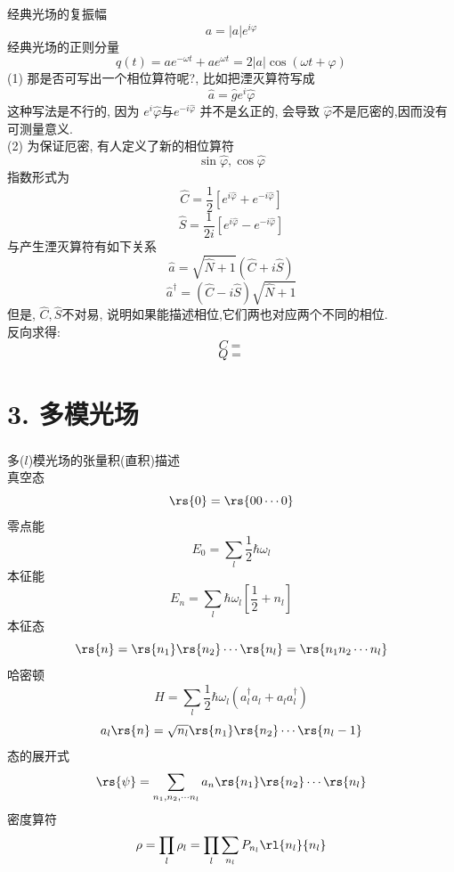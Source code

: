 \begin{frame} [allowframebreaks=] 
 \frametitle{}
      经典光场的复振幅 
      \[ a= \left|a\right| e^{i\varphi}\]
      经典光场的正则分量
      \[ q(t) = a e^{-\omega t} + a e^{\omega t} = 2\left|a \right|\cos(\omega t + \varphi)\]
      (1) 那是否可写出一个相位算符呢?, 比如把湮灭算符写成
      \[ \hat{a} = \hat{g} e ^ i \hat{\varphi} \]
      这种写法是不行的, 因为
      $e ^ i \hat{\varphi}$与$e ^ {-i \hat{\varphi}}$ 并不是幺正的, 会导致 $\hat{\varphi}$不是厄密的,因而没有可测量意义. \\ {\vspace*{0.3em}}
      (2) 为保证厄密, 有人定义了新的相位算符
      \[ \sin \hat{\varphi}, \cos \hat{\varphi}\]
      指数形式为
      \[\hat{C}= \frac{1}{2} [e^{i \hat{\varphi}} + e^{- i \hat{\varphi}}]\]
      \[\hat{S}= \frac{1}{2i} [e^{i \hat{\varphi}} - e^{- i \hat{\varphi}}]\]
      与产生湮灭算符有如下关系
      \[\hat{a}= \sqrt{\hat{N}+1}(\hat{C}+i\hat{S})\]
      \[\hat{a}^{\dagger}= (\hat{C}-i\hat{S})\sqrt{\hat{N}+1}\]
      但是, $\hat{C}, \hat{S}$不对易, 说明如果能描述相位,它们两也对应两个不同的相位.\\ 
      反向求得:
      \[ C= \]
      \[ Q= \]
\end{frame}

\section{3. 多模光场}

\begin{frame}[allowframebreaks=]  
 \frametitle{}
 多($l$)模光场的张量积(直积)描述\\ 
 真空态
 \[ \rs{0 }= \rs{00\cdots 0 } \] 
零点能
\[ E_0 = \sum_l \frac{1}{2} \hbar \omega_l\]
本征能
\[ E_n = \sum_l  \hbar \omega_l[\frac{1}{2}+ n_l]\]
本征态
\[\rs{n } =\rs{n_1 }\rs{n_2 }\cdots \rs{n_l }= \rs{n_1n_2  \cdots n_l } \]
哈密顿
\[ H = \sum_l \frac{1}{2} \hbar \omega_l(a^{\dagger}_l a_l + a_la^{\dagger}_l )\]
\[ a_l \rs{n } = \sqrt{n_l}\rs{n_1 }\rs{n_2 }\cdots \rs{n_{l}-1 } \]
态的展开式
\[ \rs{\psi} = \sum_{n_1, n_2, \cdots n_l} a_n \rs{n_1 }\rs{n_2 }\cdots \rs{n_{l}}\]
密度算符
\[ \rho = \prod_l \rho_l = \prod_l \sum_{n_l} P_{n_l}\rl{n_l}{n_l}
\]
\end{frame}

